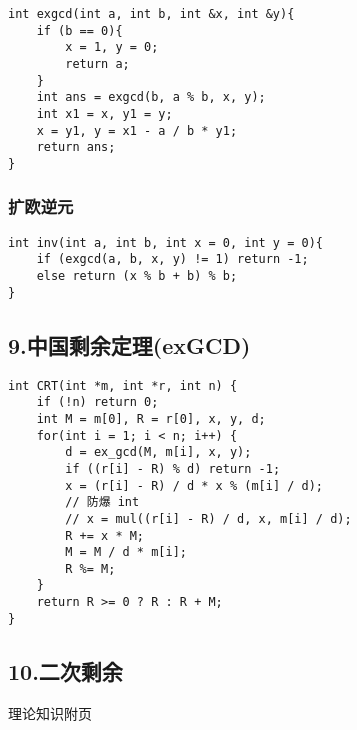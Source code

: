 \documentclass[]{article}
\begin{document}
\begin{verbatim}
int exgcd(int a, int b, int &x, int &y){
    if (b == 0){
        x = 1, y = 0;
        return a;
    }
    int ans = exgcd(b, a % b, x, y);
    int x1 = x, y1 = y;
    x = y1, y = x1 - a / b * y1;
    return ans;
}
\end{verbatim}

\hypertarget{ux6269ux6b27ux9006ux5143}{%
\subsubsection{扩欧逆元}\label{ux6269ux6b27ux9006ux5143}}

\begin{verbatim}
int inv(int a, int b, int x = 0, int y = 0){
    if (exgcd(a, b, x, y) != 1) return -1;
    else return (x % b + b) % b;
}
\end{verbatim}

\hypertarget{ux4e2dux56fdux5269ux4f59ux5b9aux7406exgcd}{%
\subsection{9.中国剩余定理(exGCD)}\label{ux4e2dux56fdux5269ux4f59ux5b9aux7406exgcd}}

\begin{verbatim}
int CRT(int *m, int *r, int n) {
    if (!n) return 0;
    int M = m[0], R = r[0], x, y, d;
    for(int i = 1; i < n; i++) {
        d = ex_gcd(M, m[i], x, y);
        if ((r[i] - R) % d) return -1;
        x = (r[i] - R) / d * x % (m[i] / d);
        // 防爆 int
        // x = mul((r[i] - R) / d, x, m[i] / d);
        R += x * M;
        M = M / d * m[i];
        R %= M;
    }
    return R >= 0 ? R : R + M;
}
\end{verbatim}

\hypertarget{ux4e8cux6b21ux5269ux4f59}{%
\subsection{10.二次剩余}\label{ux4e8cux6b21ux5269ux4f59}}

理论知识附页
\end{document}
